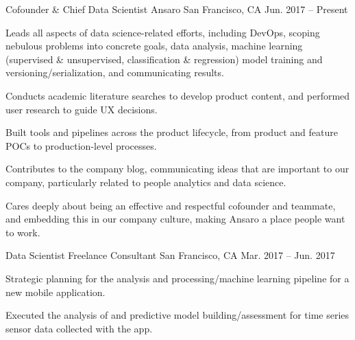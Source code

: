 
\begin{cventries}

  \cventry
    {Cofounder \& Chief Data Scientist} %
    {Ansaro} %
    {San Francisco, CA} %
    {Jun. 2017 -- Present} %
    {
      \begin{cvitems} %
        \item {Leads all aspects of data science-related efforts, including DevOps, scoping nebulous problems into concrete goals, data analysis, machine learning (supervised \& unsupervised, classification \& regression) model training and versioning/serialization, and communicating results.}
        \item {Conducts academic literature searches to develop product content, and performed user research to guide UX decisions.}
        \item {Built tools and pipelines across the product lifecycle, from product and feature POCs to production-level processes.}
        \item {Contributes to the company blog, communicating ideas that are important to our company, particularly related to people analytics and data science.}
        \item {Cares deeply about being an effective and respectful cofounder and teammate, and embedding this in our company culture, making Ansaro a place people want to work.}
     \end{cvitems}
    }

  \cventry
    {Data Scientist} %
    {Freelance Consultant} %
    {San Francisco, CA} %
    {Mar. 2017 -- Jun. 2017} %
    {
      \begin{cvitems} %
        \item {Strategic planning for the analysis and processing/machine learning pipeline for a new mobile application.}
        \item {Executed the analysis of and predictive model building/assessment for time series sensor data collected with the app.}
     \end{cvitems}
    }


\end{cventries}
